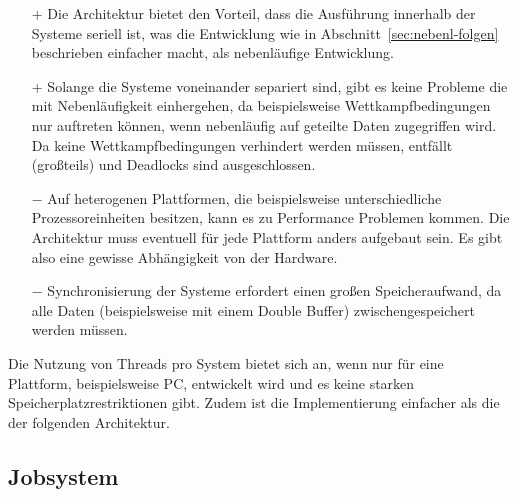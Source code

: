 \begin{itemize}
	\item[$+$] Die Architektur bietet den Vorteil, dass die Ausführung innerhalb der Systeme seriell ist, was die Entwicklung wie in Abschnitt~\ref{sec:nebenl-folgen} beschrieben einfacher macht, als nebenläufige Entwicklung.
	\item[$+$] Solange die Systeme voneinander separiert sind, gibt es keine Probleme die mit Nebenläufigkeit einhergehen, da beispielsweise Wettkampfbedingungen nur auftreten können, wenn nebenläufig auf geteilte Daten zugegriffen wird. Da keine Wettkampfbedingungen verhindert werden müssen, entfällt (großteils) und Deadlocks sind ausgeschlossen.
	\item[$-$] Auf heterogenen Plattformen, die beispielsweise unterschiedliche Prozessoreinheiten besitzen, kann es zu Performance Problemen kommen. Die Architektur muss eventuell für jede Plattform anders aufgebaut sein. Es gibt also eine gewisse Abhängigkeit von der Hardware.
	\item[$-$] Synchronisierung der Systeme erfordert einen großen Speicheraufwand, da alle Daten (beispielsweise mit einem Double Buffer) zwischengespeichert werden müssen.
\end{itemize}

Die Nutzung von Threads pro System bietet sich an, wenn nur für eine Plattform, beispielsweise PC, entwickelt wird und es keine starken Speicherplatzrestriktionen gibt. Zudem ist die Implementierung einfacher als die der folgenden Architektur.

\subsection{Jobsystem}

